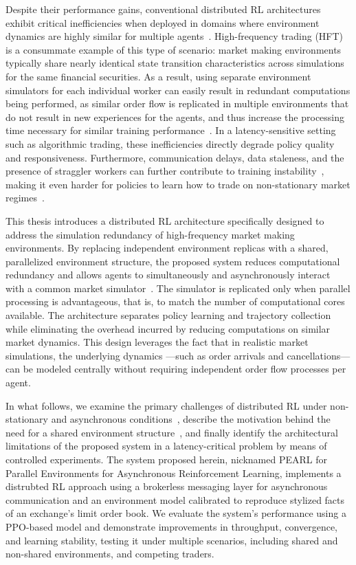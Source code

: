 Despite their performance gains, conventional distributed RL architectures exhibit critical inefficiencies when
deployed in domains where environment dynamics are highly similar for multiple agents~\citep{AlSaffar2023,Lu2024}.
High-frequency trading (HFT) is a consummate example of this type of scenario: market making environments typically share nearly
identical state transition characteristics across simulations for the same financial securities.
As a result, using separate environment simulators for each individual worker can easily result in redundant computations being performed,
as similar order flow is replicated in multiple environments that do not result in new experiences for the agents, 
and thus increase the processing time necessary for similar training performance~\citep{Hou2025}.
In a latency-sensitive setting such as algorithmic trading, these inefficiencies directly degrade policy quality and responsiveness.
Furthermore, communication delays, data staleness, and the presence of straggler workers can further contribute to training instability~\citep{He2022,Xie2023},
making it even harder for policies to learn how to trade on non-stationary market regimes~\citep{Borzilov2025}.

This thesis introduces a distributed RL architecture specifically designed to address the simulation redundancy of high-frequency market making environments.
By replacing independent environment replicas with a shared, parallelized environment structure,
the proposed system reduces computational redundancy and allows agents to simultaneously and asynchronously interact with a common market simulator~\citep{Yin2024,Hou2025}.
The simulator is replicated only when parallel processing is advantageous, that is,
to match the number of computational cores available.
The architecture separates policy learning and trajectory collection while eliminating the overhead incurred by reducing computations on similar market dynamics.
This design leverages the fact that in realistic market simulations, the underlying dynamics
---such as order arrivals and cancellations---can be modeled centrally without requiring independent order flow processes per agent.

In what follows, we examine the primary challenges of distributed RL under non-stationary and asynchronous conditions~\citep{Huh2023}, 
describe the motivation behind the need for a shared environment structure~\citep{Cho2023,Furukawa2022},
and finally identify the architectural limitations of the proposed system in a latency-critical problem by means of controlled experiments.
The system proposed herein, nicknamed PEARL for Parallel Environments for Asynchronous Reinforcement Learning,
implements a distrubted RL approach using a brokerless messaging layer for asynchronous communication and an environment model
calibrated to reproduce stylized facts of an exchange's limit order book.
We evaluate the system's performance using a PPO-based model and demonstrate improvements in
throughput, convergence, and learning stability, testing it under multiple scenarios, including shared and non-shared environments, 
and competing traders.


